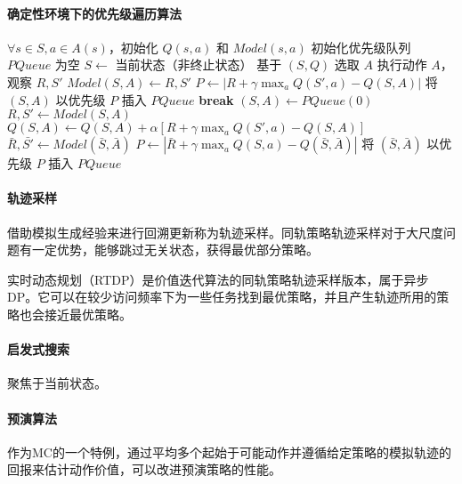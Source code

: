 \documentclass[
12pt, %
a4paper, 
oneside, %
headinclude,footinclude, %
]{scrartcl}
\begin{document}
\paragraph{确定性环境下的优先级遍历算法}
\begin{myalgorithm}[确定性环境下的优先级遍历算法]
\State $\forall s \in S, a \in A(s)$，初始化 $Q(s, a)$ 和 $Model(s, a)$
\State 初始化优先级队列 $PQueue$ 为空
\Loop
    \State $S \gets$ 当前状态（非终止状态）
    \State 基于 $(S, Q)$ 选取 $A$ 
    \State 执行动作 $A$，观察 $R, S'$
    \State $Model(S, A) \gets R, S'$ 
    \State $P \gets |R + \gamma \max_a Q(S', a) - Q(S, A)|$ 
        \State 将 $(S, A)$ 以优先级 $P$ 插入 $PQueue$
    \EndIf
     
            \State \textbf{break}
        \EndIf
        \State $(S, A) \gets PQueue(0)$ 
        \State $R, S' \gets Model(S, A)$ 
        \State $Q(S, A) \gets Q(S, A) + \alpha[R + \gamma \max_a Q(S', a) - Q(S, A)]$ 
         
            \State $\bar{R}, \bar{S'} \gets Model(\bar{S}, \bar{A})$
                \State $P \gets |\bar{R} + \gamma \max_a Q(S, a) - Q(\bar{S}, \bar{A})|$
                    \State 将 $(\bar{S}, \bar{A})$ 以优先级 $P$ 插入 $PQueue$
                \EndIf
            \EndIf
        \EndFor
    \EndFor
\EndLoop
\end{myalgorithm}
\paragraph{轨迹采样}
借助模拟生成经验来进行回溯更新称为轨迹采样。同轨策略轨迹采样对于大尺度问题有一定优势，能够跳过无关状态，获得最优部分策略。

实时动态规划（RTDP）是价值迭代算法的同轨策略轨迹采样版本，属于异步DP。它可以在较少访问频率下为一些任务找到最优策略，并且产生轨迹所用的策略也会接近最优策略。
\paragraph{启发式搜索}
聚焦于当前状态。
\paragraph{预演算法}
作为MC的一个特例，通过平均多个起始于可能动作并遵循给定策略的模拟轨迹的回报来估计动作价值，可以改进预演策略的性能。
\end{document}
